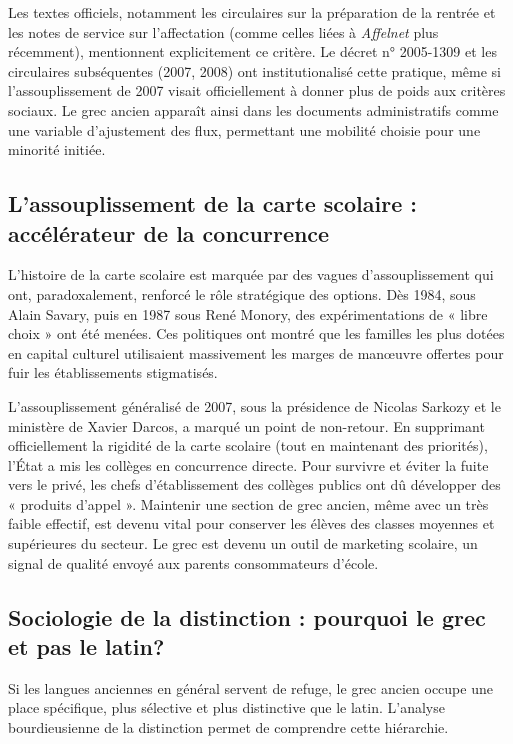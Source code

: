 Les textes officiels, notamment les circulaires sur la préparation de la rentrée et les notes de
service sur l'affectation (comme celles liées à \textit{Affelnet} plus récemment), mentionnent
explicitement ce critère. Le décret n° 2005-1309 et les circulaires subséquentes (2007, 2008) ont
institutionalisé cette pratique, même si l'assouplissement de 2007 visait officiellement à donner
plus de poids aux critères sociaux.\cite{I-3-1-ref5} Le grec ancien apparaît ainsi dans les
documents administratifs comme une variable d'ajustement des flux, permettant une mobilité choisie
pour une minorité initiée.



\subsection{L'assouplissement de la carte scolaire : accélérateur de la concurrence}

L'histoire de la carte scolaire est marquée par des vagues d'assouplissement qui ont,
paradoxalement, renforcé le rôle stratégique des options. Dès 1984, sous Alain Savary, puis en 1987
sous René Monory, des expérimentations de « libre choix » ont été menées.\cite{I-3-1-ref19} Ces
politiques ont montré que les familles les plus dotées en capital culturel utilisaient massivement
les marges de manœuvre offertes pour fuir les établissements stigmatisés.

L'assouplissement généralisé de 2007, sous la présidence de Nicolas Sarkozy et le ministère de
Xavier Darcos, a marqué un point de non-retour. En supprimant officiellement la rigidité de la carte
scolaire (tout en maintenant des priorités), l'État a mis les collèges en concurrence directe. Pour
survivre et éviter la fuite vers le privé, les chefs d'établissement des collèges publics ont dû
développer des « produits d'appel ». Maintenir une section de grec ancien, même avec un très faible
effectif, est devenu vital pour conserver les élèves des classes moyennes et supérieures du
secteur.\cite{I-3-1-ref21} Le grec est devenu un outil de marketing scolaire, un signal de qualité
envoyé aux parents consommateurs d'école.



\subsection{Sociologie de la distinction : pourquoi le grec et pas le latin?}

Si les langues anciennes en général servent de refuge, le grec ancien occupe une place spécifique,
plus sélective et plus distinctive que le latin. L'analyse bourdieusienne de la distinction permet
de comprendre cette hiérarchie.



